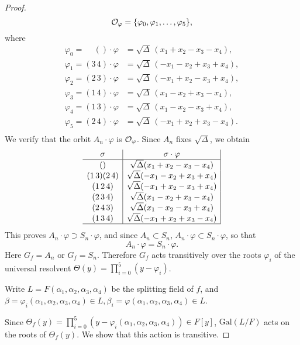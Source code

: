 \documentclass[11pt,a4paper]{article}
\newcommand{\Gal}{\mathrm{Gal}}
\begin{document}
{\begin{proof}
$${\cal O}_\varphi = \{\varphi_0, \varphi_1,\ldots,\varphi_5\},$$
where
\begin{align*}
\varphi_0  = \phantom{3\,4}() \cdot \varphi &= \sqrt{\Delta}\, (x_1+x_2 - x_3-x_4),\\
\varphi_1 = (3\,4)\cdot \varphi &= \sqrt{\Delta}\, ( - x_1-x_2 + x_3 +x_4),\\
\varphi_2 = (2\,3)\cdot \varphi &= \sqrt{\Delta}\, ( - x_1+ x_2 -x_3+x_4),\\
\varphi_3 = (1\,4) \cdot \varphi &= \sqrt{\Delta}\, (x_1- x_2 +x_3 -x_4),\\
\varphi_4= (1\,3) \cdot \varphi &= \sqrt{\Delta}\, (x_1 - x_2   -x_3+x_4),\\
\varphi_5= (2\,4) \cdot \varphi &= \sqrt{\Delta}\, ( - x_1+ x_2+x_3 -x_4).\\
\end{align*}
We verify that the orbit $A_n\cdot \varphi$ is ${\cal O}_\varphi$. Since $A_n$ fixes $\sqrt{\Delta}$, we obtain
$$
 \begin{array}{c|c|}
 \sigma & \sigma \cdot \varphi\\
 \hline
() & \sqrt{\Delta}(x_1+x_2-x_3-x_4)\\
(1\, 3)(2\, 4)  & \sqrt{\Delta}(-x_1-x_2+x_3+x_4)\\
 (1\,2\,4) & \sqrt{\Delta} (-x_1+x_2 - x_3 +x_4)\\
 (2\,3\, 4)  & \sqrt{\Delta}(x_1 -x_2+x_3-x_4)\\
 (2\,4\, 3)  & \sqrt{\Delta} (x_1-x_2 -x_3 + x_4)\\
 (1\,3\, 4)  & \sqrt{\Delta}(-x_1 + x_2 + x_3 -x_4)\\
 \hline
 \end{array}
 $$
 This proves $A_n \cdot \varphi \supset S_n \cdot \varphi$, and since $A_n \subset S_n$, $A_n \cdot \varphi \subset S_n \cdot \varphi$, so that
 $$A_n \cdot \varphi = S_n \cdot \varphi.$$
Here $G_f = A_n$ or $G_f = S_n$. Therefore $G_f$ acts transitively over the roots $\varphi_i$ of the universal resolvent $\Theta(y) = \prod\limits_{i=0}^5 (y - \varphi_i)$.

Write $L = F(\alpha_1,\alpha_2,\alpha_3,\alpha_4)$ be the splitting field of $f$, and $\beta = \varphi_i(\alpha_1,\alpha_2,\alpha_3,\alpha_4) \in L, \beta_i =\varphi(\alpha_1,\alpha_2,\alpha_3,\alpha_4) \in L$.

Since $\Theta_f(y) = \prod\limits_{i=0}^5 (y - \varphi_i(\alpha_1,\alpha_2,\alpha_3,\alpha_4)) \in F[y]$,  $\Gal(L/F)$ acts on the roots of $\Theta_f(y)$. We show that this action is transitive.


\end{proof}}
\end{document}
